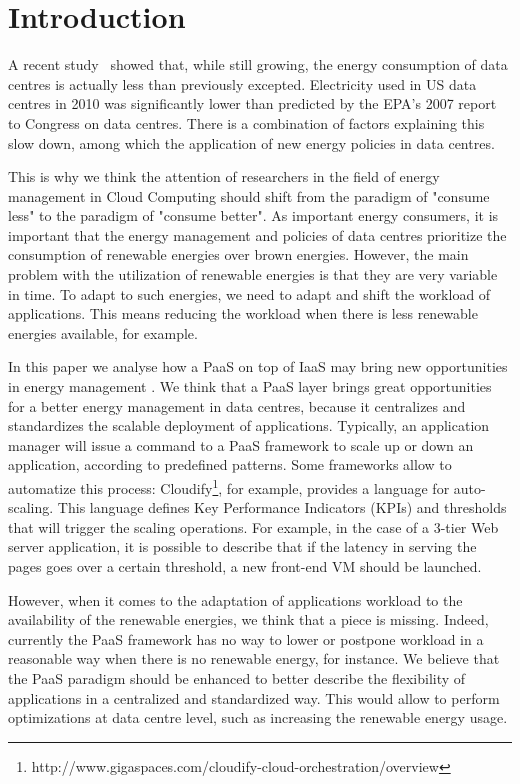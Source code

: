 \section{Introduction}
\label{sec: intro}

A recent study~\cite{koomey2011} showed that, while still growing, the energy consumption of data centres is actually less than previously excepted.
Electricity used in US data centres in 2010 was significantly lower than predicted by the EPA’s 2007 report to Congress on data centres.
There is a combination of factors explaining this slow down, among which the application of new energy policies in data centres.

This is why we think the attention of researchers in the field of energy management in Cloud Computing should shift from the paradigm of "consume less" to the paradigm of "consume better".
As important energy consumers, it is important that the energy management and policies of data centres prioritize the consumption of renewable energies over brown energies.
However, the main problem with the utilization of renewable energies is that they are very variable in time.
To adapt to such energies, we need to adapt and shift the workload of applications.
This means reducing the workload when there is less renewable energies available, for example.

In this paper we analyse how a PaaS on top of IaaS may bring new opportunities in energy management .
We think that a PaaS layer brings great opportunities for a better energy management in data centres, because it centralizes and standardizes the scalable deployment of applications.
Typically, an application manager will issue a command to a PaaS framework to scale up or down an application, according to predefined patterns.
Some frameworks allow to automatize this process: Cloudify\footnote{http://www.gigaspaces.com/cloudify-cloud-orchestration/overview}, for example, provides a language for auto-scaling.
This language defines Key Performance Indicators (KPIs) and thresholds that will trigger the scaling operations.
For example, in the case of a 3-tier Web server application, it is possible to describe that if the latency in serving the pages goes over a certain threshold, a new front-end VM should be launched.

However, when it comes to the adaptation of applications workload to the availability of the renewable energies, we think that a piece is missing.
Indeed, currently the PaaS framework has no way to lower or postpone workload in a reasonable way when there is no renewable energy, for instance.
We believe that the PaaS paradigm should be enhanced to better describe the flexibility of applications in a centralized and standardized way.
This would allow to perform optimizations at data centre level, such as increasing the renewable energy usage.

